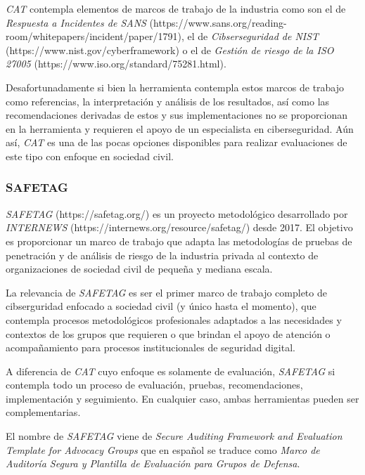 \documentclass[12pt]{caltech_thesis}
\begin{document}
\textit{CAT} contempla elementos de marcos de trabajo de la industria como son el de \textit{Respuesta a Incidentes de SANS} (https://www.sans.org/reading-room/whitepapers/incident/paper/1791), el de \textit{Cibserseguridad de NIST} (https://www.nist.gov/cyberframework) o el de \textit{Gestión de riesgo de la ISO 27005} (https://www.iso.org/standard/75281.html).

Desafortunadamente si bien la herramienta contempla estos marcos de trabajo como referencias, la interpretación y análisis de los resultados, así como las recomendaciones derivadas de estos y sus implementaciones no se proporcionan en la herramienta y requieren el apoyo de un especialista en ciberseguridad. Aún así, \textit{CAT} es una de las pocas opciones disponibles para realizar evaluaciones de este tipo con enfoque en sociedad civil.

\subsubsection{SAFETAG}

\textit{SAFETAG} (https://safetag.org/) es un proyecto metodológico desarrollado por \textit{INTERNEWS} (https://internews.org/resource/safetag/) desde 2017. El objetivo es proporcionar un marco de trabajo que adapta las metodologías de pruebas de penetración y de análisis de riesgo de la industria privada al contexto de organizaciones de sociedad civil de pequeña y mediana escala. 

La relevancia de \textit{SAFETAG} es ser el primer marco de trabajo completo de cibserguridad enfocado a sociedad civil (y único hasta el momento), que contempla procesos metodológicos profesionales adaptados a las necesidades y contextos de los grupos que requieren o que brindan el apoyo de atención o acompañamiento para procesos institucionales de seguridad digital.

A diferencia de \textit{CAT} cuyo enfoque es solamente de evaluación, \textit{SAFETAG} si contempla todo un proceso de evaluación, pruebas, recomendaciones, implementación y seguimiento.  En cualquier caso, ambas herramientas pueden ser complementarias.

El nombre de \textit{SAFETAG} viene de \textit{Secure Auditing Framework and Evaluation Template for Advocacy Groups} que en español se traduce como \textit{Marco de Auditoría Segura y Plantilla de Evaluación para Grupos de Defensa}. 
\end{document}
